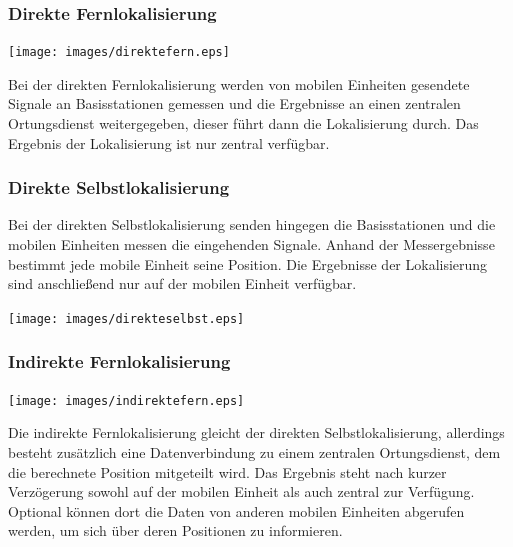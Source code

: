 \subsubsection{Direkte Fernlokalisierung} 
	\begin{minipage}{\textwidth}
		\begin{minipage}[c][6cm][c]{0.5\textwidth\relax}
			\centering
			\texttt{[image: images/direktefern.eps]} 
		\end{minipage}\hfill
		\begin{minipage}[c][6cm][t]{0.5\textwidth\relax}
			Bei der direkten Fernlokalisierung werden von mobilen Einheiten gesendete Signale an Basisstationen gemessen und die Ergebnisse an einen zentralen Ortungsdienst weitergegeben, dieser führt dann die Lokalisierung durch. Das Ergebnis der Lokalisierung ist nur zentral verfügbar.
		\end{minipage}
	\end{minipage}


\subsubsection{Direkte Selbstlokalisierung} 
	\begin{minipage}{\textwidth}
		\begin{minipage}[c][6cm][t]{0.5\textwidth\relax}
			Bei der direkten Selbstlokalisierung senden hingegen die Basisstationen und die mobilen Einheiten messen die eingehenden Signale. Anhand der Messergebnisse bestimmt jede mobile Einheit seine Position. 
			Die Ergebnisse der Lokalisierung sind anschließend nur auf der mobilen Einheit verfügbar. 
		\end{minipage}\hfill
		\begin{minipage}[c][6cm][c]{0.5\textwidth\relax}
			\centering
			\texttt{[image: images/direkteselbst.eps]} 
		\end{minipage}
	\end{minipage}


\subsubsection{Indirekte Fernlokalisierung} 
	\begin{minipage}{\textwidth}
		\begin{minipage}[c][6cm][c]{0.5\textwidth\relax}
			\centering
			\texttt{[image: images/indirektefern.eps]} 
		\end{minipage}\hfill
		\begin{minipage}[c][6cm][t]{0.5\textwidth\relax}
			Die indirekte Fernlokalisierung gleicht der direkten Selbstlokalisierung, allerdings besteht zusätzlich eine Datenverbindung zu einem zentralen Ortungsdienst, dem die berechnete Position mitgeteilt wird. 
			Das Ergebnis steht nach kurzer Verzögerung sowohl auf der mobilen Einheit als auch zentral zur Verfügung.
Optional können dort die Daten von anderen mobilen Einheiten abgerufen werden, um sich über deren Positionen zu informieren. 
		\end{minipage}
	\end{minipage}


